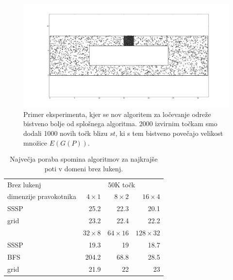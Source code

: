 \documentclass[a4paper, 12pt]{book}
\begin{document}
\begin{figure}
\centerline{\includegraphics[scale=0.3]{pics/32-1-5000-stuffed.png}}
\caption{Primer eksperimenta, kjer se nov algoritem za ločevanje odreže bistveno bolje od splošnega algoritma. 2000 izvirnim točkam smo dodali 1000 novih točk blizu $st$, ki s tem bistveno povečajo velikost množice $E(G(P))$.}
\label{sep-stuffed}
\end{figure}

\begin{table}
\begin{center}
\begin{tabular}{l*{3}{r}}
Brez lukenj & \multicolumn{3}{c}{50K točk}\\						
dimenzije pravokotnika	&	$4\times 1$	&	$8\times 2$	&	$16\times 4$ \\
\hline
SSSP	&	25.2	&	22.3	&	20.1		\\
grid	&	23.2	&	22.4	&	22.2	\vspace{.2cm}	\\

&	$32\times 8$	&	$64\times 16$	&	$128\times 32$	\\
\hline
SSSP &	19.3	&	19	&	18.7 \\
BFS &	204.2	&	68.8	&	28.5 \\
grid &	21.9	&	22	&	23 \vspace{.2cm} \\
\end{tabular}
\caption{Največja poraba spomina algoritmov za najkrajše poti v domeni brez lukenj.}
\label{table-ram-tree-1}
\end{center}
\end{table}
\end{document}
